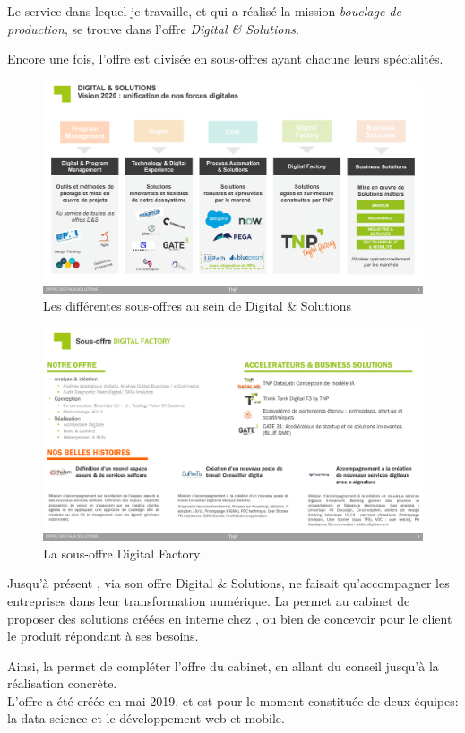 Le service \df dans lequel je travaille, et qui a réalisé la mission \emph{bouclage de production}, se trouve dans l'offre \emph{Digital \& Solutions}.

Encore une fois, l'offre est divisée en sous-offres ayant chacune leurs spécialités.

\begin{figure}[H]
    \centering
    \includegraphics[width=1\linewidth]{img/Offre digital and solutions TNP_20200131-05.png}
    \caption{Les différentes sous-offres au sein de Digital \& Solutions}
\end{figure}

\begin{figure}[H]
    \centering
    \includegraphics[width=1\linewidth]{img/Offre digital and solutions TNP_20200131-10.png}
    \caption{La sous-offre Digital Factory}
\end{figure}

Jusqu'à présent \entreprise, via son offre Digital \& Solutions, ne faisait qu'accompagner les entreprises dans leur transformation numérique. La \df permet au cabinet de proposer des solutions créées en interne chez \entreprise, ou bien de concevoir pour le client le produit répondant à ses besoins.

Ainsi, la \df permet de compléter l'offre du cabinet, en allant du conseil jusqu'à la réalisation concrète.\\
L'offre a été créée en mai 2019, et est pour le moment constituée de deux équipes: la data science et le développement web et mobile.
